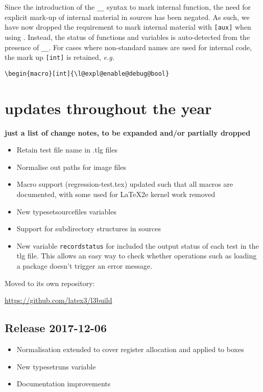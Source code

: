 \documentclass{ltnews}
\begin{document}
Since the introduction of the \verb|__| syntax to mark internal function, the
need for explicit mark-up of internal material in sources has been negated.
As such, we have now dropped the requirement to mark internal material with
\verb|[aux]| when using . Instead, the status of functions and
variables is auto-detected from the presence of \verb|__|. For cases where
non-standard names are used for internal code, the mark up \verb|[int]| is
retained, \emph{e.g.}
\begin{verbatim}
\begin{macro}[int]{\l@expl@enable@debug@bool}
\end{verbatim}

\section{ updates throughout the year}

\textbf{just a list of change notes, to be expanded and/or partially dropped}

\begin{itemize}
\item Retain test file name in .tlg files
\item Normalise out paths for image files
\item Macro support (regression-test.tex) updated such that
  all macros are documented, with some used for LaTeX2e kernel
  work removed
\item New typesetsourcefiles variables
\item Support for subdirectory structures in sources
\item New variable \texttt{recordstatus} for included the output status of each test in the tlg file. This allows an easy way to check whether operations such as loading a package doesn't trigger an error message.
\end{itemize}

Moved  to its own repository:

\url{https://github.com/latex3/l3build}


\subsection{Release 2017-12-06}

\begin{itemize}
\item Normalisation extended to cover
  register allocation and
   applied to boxes
\item New typesetruns variable
\item Documentation improvements
\end{itemize}
\end{document}
